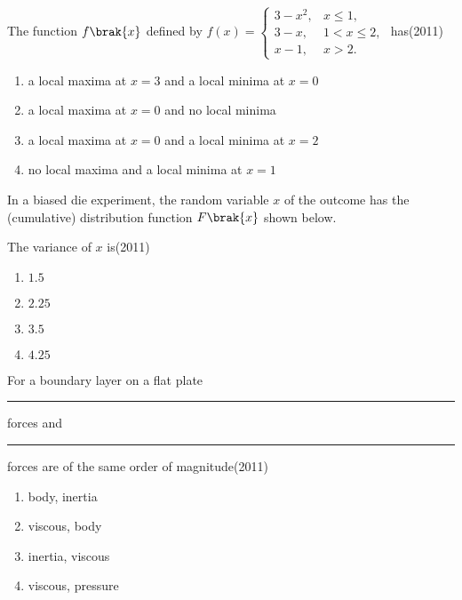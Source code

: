 \item The function $f\brak{x}$ defined by $f(x)=
\begin{cases} 
3-x^{2},&x\leq1,\\ 
3-x,&1<x\leq 2,\\ 
x-1,&x>2. 
\end{cases}
$ has\hfill(2011)
\begin{enumerate}
\item a local maxima at $x=3$ and a local minima at $x=0$
\item a local maxima at $x=0$ and no local minima
\item a local maxima at $x=0$ and a local minima at $x=2$
\item no local maxima and a local minima at $x=1$
\end{enumerate}


\item In a biased die experiment, the random variable $x$ of the outcome has the (cumulative) distribution function $F\brak{x}$ shown below.\\

The variance of $x$ is\hfill(2011)
\begin{multicols}{2}
\begin{enumerate}
\item $1.5$
\item $2.25$
\item $3.5$
\item $4.25$
\end{enumerate}
\end{multicols}


\item For a boundary layer on a flat plate \rule{1cm}{0.15mm} forces and \rule{1cm}{0.15mm} forces are of the same order of magnitude\hfill(2011)
\begin{multicols}{2}
\begin{enumerate}
\item body, inertia
\item viscous, body
\item inertia, viscous
\item viscous, pressure
\end{enumerate}
\end{multicols}


